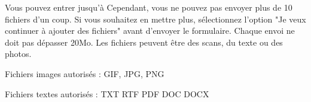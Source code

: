 ﻿Vous pouvez entrer jusqu'à %
Cependant, vous ne pouvez pas envoyer plus de 10 fichiers d'un coup. Si vous souhaitez en mettre plus, sélectionnez l'option "Je veux continuer à ajouter des fichiers" avant d'envoyer le formulaire.
Chaque envoi ne doit pas dépasser 20Mo.
Les fichiers peuvent être des scans, du texte ou des photos.
\item Fichiers images autorisés : GIF, JPG, PNG
\item Fichiers textes autorisés : TXT RTF PDF DOC DOCX